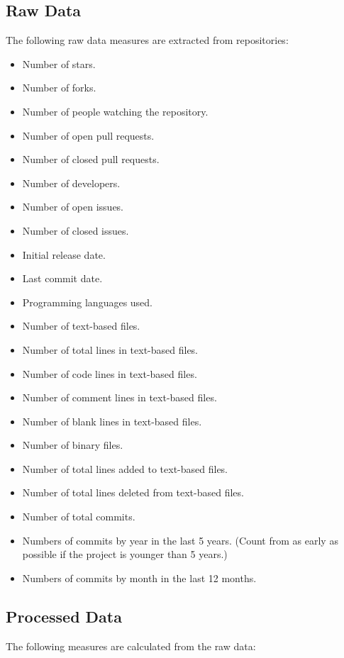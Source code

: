\documentclass[letterpaper,cleveref]{lipics-v2019}
\theoremstyle{definition}
\begin{document}
\subsection{Raw Data}\label{rawdata}

The following raw data measures are extracted from repositories:

\begin{itemize}
\item Number of stars.
\item Number of forks.
\item Number of people watching the repository.
\item Number of open pull requests.
\item Number of closed pull requests.	
\item Number of developers.	
\item Number of open issues.
\item Number of closed issues.
\item Initial release date.
\item Last commit date.
\item Programming languages used.
\item Number of text-based files.
\item Number of total lines in text-based files.
\item Number of code lines in text-based files.
\item Number of comment lines in text-based files.
\item Number of blank lines in text-based files.
\item Number of binary files.  
\item Number of total lines added to text-based files.
\item Number of total lines deleted from text-based files.
\item Number of total commits.
\item Numbers of commits by year in the last 5 years. (Count from as early as
  possible if the project is younger than 5 years.)
\item Numbers of commits by month in the last 12 months.
\end{itemize}

\subsection{Processed Data}\label{processeddata}

The following measures are calculated from the raw data:
\end{document}

